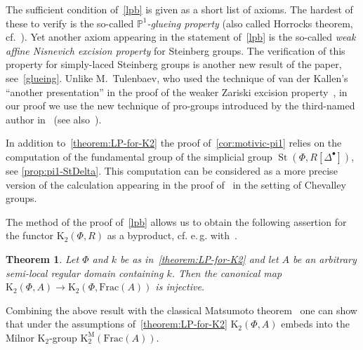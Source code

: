 \documentclass[oneside, 11pt]{amsart} \pdfoutput=1
\newcommand{\K}{{\mathrm{K}}}
\newcommand{\St}{\mathop{\mathrm{St}}\nolimits}
\numberwithin{equation}{section}
\newtheorem{theorem}[lemma]{Theorem}
\theoremstyle{definition}
\begin{document}
The sufficient condition of~\cref{lpb} is given as a short list of axioms. The hardest of these to verify is the so-called {\it $\mathbb{P}^1$-glueing property} (also called Horrocks theorem, cf.~\cite{LS20}). Yet another axiom appearing in the statement of~\cref{lpb} is the so-called {\it weak affine Nisnevich excision property} for Steinberg groups. The verification of this property for simply-laced Steinberg groups is another new result of the paper, see~\cref{glueing}. Unlike M.~Tulenbaev, who used the technique of van der Kallen's ``another presentation'' in the proof of the weaker Zariski excision property~\cite[Proposition~1.4]{Tu83}, in our proof we use the new technique of pro-groups introduced by the third-named author in~\cite{Vor1} (see also~\cite{LSV20}). %

In addition to~\cref{theorem:LP-for-K2} the proof of~\cref{cor:motivic-pi1} relies on the computation of the fundamental group of the simplicial group $\St(\Phi, R[\Delta^\bullet])$, see \cref{prop:pi1-StDelta}. This computation can be considered as a more precise version of the calculation appearing in the proof of~\cite[Proposition~3.2]{VW16} in the setting of Chevalley groups.

The method of the proof of~\cref{lpb} allows us to obtain the following assertion for the functor $\K_2(\Phi, R)$ as a byproduct, cf. e.\,g. with~\cite[Theorem~1.2]{Sta20}.
\begin{theorem} \label{theorem:Gersten} Let $\Phi$ and $k$ be as in~\cref{theorem:LP-for-K2} and let $A$ be an arbitrary semi-local regular domain containing $k$. Then the canonical map $\K_2(\Phi, A) \to \K_2(\Phi, \mathrm{Frac}(A))$ is injective. \end{theorem}

Combining the above result with the classical Matsumoto theorem~\cite[Theorem~5.10]{Ma69} one can show that under the assumptions of~\cref{theorem:LP-for-K2} $\K_2(\Phi, A)$ embeds into the Milnor $\K_2$-group $\K_2^\mathrm{M}(\mathrm{Frac}(A))$.
\end{document}
